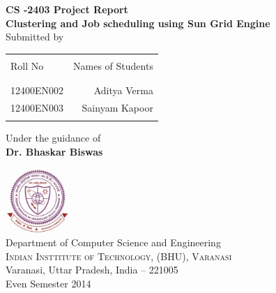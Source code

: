 \begin{titlepage}

\begin{center}

\textup{\small {\bf CS -2403  Project Report}}\\[0.2in]

\Large \textbf {Clustering and Job scheduling using Sun Grid Engine}\\[0.5in]

\normalsize Submitted by \\
\begin{table}[h]
\centering
\begin{tabular}{lr}\hline \\
Roll No & Names of Students \\ \\ \hline
\\
12400EN002 & Aditya Verma \\ 
12400EN003 & Sainyam Kapoor \\
\\ \hline 
\end{tabular}
\end{table}

\vspace{.1in}
Under the guidance of\\
{\textbf{Dr. Bhaskar Biswas}}\\[0.2in]

\vfill

\includegraphics[width=0.18\textwidth]{./IITBHU_Logo_Matlab}\\[0.1in]
\Large{Department of Computer Science and Engineering}\\
\normalsize
\textsc{Indian Insttitute of Technology, (BHU), Varanasi}\\
Varanasi, Uttar Pradesh, India -- 221005\\
\vspace{0.2cm}
Even Semester 2014

\end{center}

\end{titlepage}
